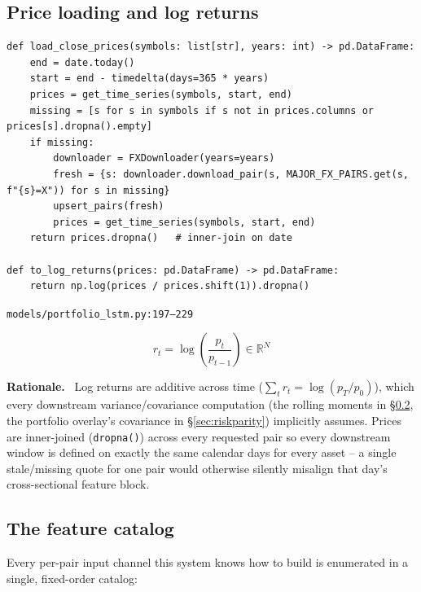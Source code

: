 \documentclass[11pt]{article}
\newcommand{\srcref}[1]{\hfill\textcolor{cmtcolor}{\footnotesize\texttt{#1}}}
\newcommand{\code}[1]{\texttt{\small #1}}
\newcommand{\rationalelabel}{\small\textbf{Rationale.}~}
\begin{document}
\subsection{Price loading and log returns}

\begin{lstlisting}[caption={Close prices from Postgres, downloading/upserting on demand.}, label=lst:loadclose]
def load_close_prices(symbols: list[str], years: int) -> pd.DataFrame:
    end = date.today()
    start = end - timedelta(days=365 * years)
    prices = get_time_series(symbols, start, end)
    missing = [s for s in symbols if s not in prices.columns or prices[s].dropna().empty]
    if missing:
        downloader = FXDownloader(years=years)
        fresh = {s: downloader.download_pair(s, MAJOR_FX_PAIRS.get(s, f"{s}=X")) for s in missing}
        upsert_pairs(fresh)
        prices = get_time_series(symbols, start, end)
    return prices.dropna()   # inner-join on date

def to_log_returns(prices: pd.DataFrame) -> pd.DataFrame:
    return np.log(prices / prices.shift(1)).dropna()
\end{lstlisting}
\srcref{models/portfolio\_lstm.py:197--229}

\begin{equation}
  r_t = \log\!\left(\frac{p_t}{p_{t-1}}\right) \in \mathbb{R}^N
  \label{eq:logret}
\end{equation}

\begin{rationale}\rationalelabel
Log returns are additive across time ($\sum_t r_t = \log(p_T/p_0)$), which every downstream
variance/covariance computation (the rolling moments in \S\ref{sec:features}, the portfolio
overlay's covariance in \S\ref{sec:riskparity}) implicitly assumes. Prices are inner-joined
(\code{dropna()}) across every requested pair so every downstream window is defined on
exactly the same calendar days for every asset -- a single stale/missing quote for one pair
would otherwise silently misalign that day's cross-sectional feature block.
\end{rationale}

\subsection{The feature catalog}
\label{sec:features}

Every per-pair input channel this system knows how to build is enumerated in a single,
fixed-order catalog:
\end{document}
